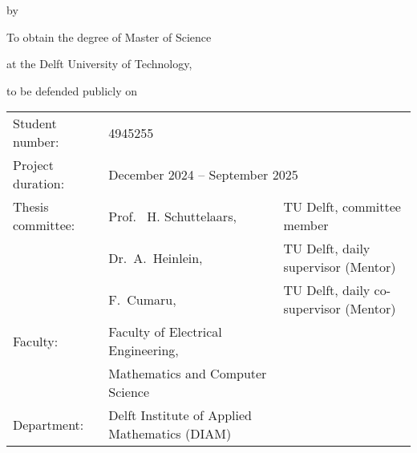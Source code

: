 \begin{titlepage}

    \begin{center}

        {\makeatletter
            \largecoverstyle\fontsize{40}{40}\selectfont\@title
            \makeatother}

        {\makeatletter
            \ifdefvoid{\@subtitle}{}{\bigskip\coverstyle\fontsize{22}{22}\selectfont\@subtitle}
            \makeatother}

        \bigskip
        \bigskip

        by

        \bigskip
        \bigskip

        {\makeatletter
            \coverstyle\fontsize{14}{14}\selectfont\@author
            \makeatother}

        \bigskip
        \bigskip

        To obtain the degree of Master of Science

        at the Delft University of Technology,

        to be defended publicly on \theDefenseDateTime

        \vfill

        \begin{tabular}{lll}
            Student number:   & 4945255                                                                                                            \\
            Project duration: & \multicolumn{2}{l}{December 2024 -- September 2025}                                                                \\
            Thesis committee: & Prof. \ H. Schuttelaars,                            & TU Delft, committee member \\
                              & Dr.\ A.\ Heinlein,                                  & TU Delft, daily supervisor (Mentor)     \\
                              & F.\ Cumaru,                                         & TU Delft, daily co-supervisor (Mentor)  \\
            Faculty:          & Faculty of Electrical Engineering,                                                                                 \\
                              & Mathematics and Computer Science                                                                                   \\
            Department:       & Delft Institute of Applied Mathematics (DIAM)                                                                      \\
        \end{tabular}


\end{center}
\end{titlepage}
